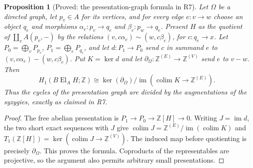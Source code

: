 \documentclass[11pt,a4paper]{article}
\newtheorem{proposition}[theorem]{Proposition}
\theoremstyle{definition}
\begin{document}
\begin{proposition}[Proved: the presentation-graph formula in R7]\label{B:presentation}
Let $\Omega$ be a directed graph, let $p_v\in A$ for its vertices,
and for every edge $e:v\to w$ choose an object $q_e$ and morphisms
$\alpha_e:p_v\to q_e$ and $\beta_e:p_w\to q_e$.
Present $H$ as the quotient of $\coprod_v A(p_v,-)$ by the relations
$(v,c\alpha_e)\sim(w,c\beta_e)$, for $c:q_e\to x$.
Let $P_0=\bigoplus_vP_{p_v}$, $P_1=\bigoplus_eP_{q_e}$,
and let $d:P_1\to P_0$ send $c$ in summand $e$ to
$(v,c\alpha_e)-(w,c\beta_e)$.  Put $K=\ker d$ and let
$\partial_\Omega:\mathbb Z^{(E)}\to\mathbb Z^{(V)}$ send $e$ to $v-w$.
Then
\[
 H_1(B\operatorname{El}_A H;\mathbb Z)
  \cong\ker(\partial_\Omega)/
       \operatorname{im}(\operatorname{colim}K\to\mathbb Z^{(E)}).
\]
Thus the cycles of the presentation graph are divided by the
augmentations of the syzygies, exactly as claimed in R7.
\end{proposition}
\begin{proof}
The free abelian presentation is $P_1\to P_0\to\mathbb Z[H]\to0$.
Writing $J=\operatorname{im}d$, the two short exact sequences with
$J$ give
$\operatorname{colim}J=\mathbb Z^{(E)}/\operatorname{im}(\operatorname{colim}K)$
and
$T_1(\mathbb Z[H])=\ker(\operatorname{colim}J\to\mathbb Z^{(V)})$.
The induced map before quotienting is precisely $\partial_\Omega$.
This proves the formula.  Coproducts of the representables are
projective, so the argument also permits arbitrary small presentations.
\end{proof}
\end{document}
